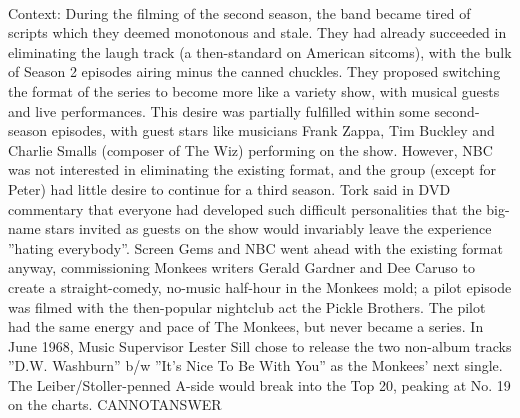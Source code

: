 \documentclass[11pt,a4paper, onecolumn]{article}
\begin{document}
\\ Context: During the filming of the second season, the band became tired of scripts which they deemed monotonous and stale. They had already succeeded in eliminating the laugh track (a then-standard on American sitcoms), with the bulk of Season 2 episodes airing minus the canned chuckles. They proposed switching the format of the series to become more like a variety show, with musical guests and live performances. This desire was partially fulfilled within some second-season episodes, with guest stars like musicians Frank Zappa, Tim Buckley and Charlie Smalls (composer of The Wiz) performing on the show. However, NBC was not interested in eliminating the existing format, and the group (except for Peter) had little desire to continue for a third season. Tork said in DVD commentary that everyone had developed such difficult personalities that the big-name stars invited as guests on the show would invariably leave the experience ''hating everybody''. Screen Gems and NBC went ahead with the existing format anyway, commissioning Monkees writers Gerald Gardner and Dee Caruso to create a straight-comedy, no-music half-hour in the Monkees mold; a pilot episode was filmed with the then-popular nightclub act the Pickle Brothers. The pilot had the same energy and pace of The Monkees, but never became a series. In June 1968, Music Supervisor Lester Sill chose to release the two non-album tracks ''D.W. Washburn'' b/w ''It's Nice To Be With You'' as the Monkees' next single. The Leiber/Stoller-penned A-side would break into the Top 20, peaking at No. 19 on the charts. CANNOTANSWER
\end{document}
